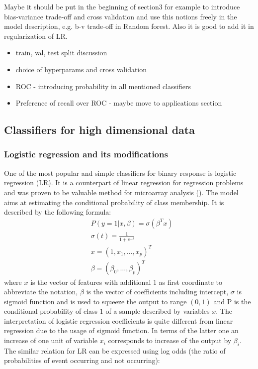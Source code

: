 \documentclass[12pt, wide]{mwart}
\begin{document}
Maybe it should be put in the beginning of section3 for example to introduce bias-variance trade-off and cross validation and use this notions freely in the model description, e.g. b-v trade-off in Random forest. Also it is good to add it in regularization of LR.


\begin{itemize}
    \item train, val, test split discussion 
    \item choice of hyperparams and cross validation
    \item ROC - introducing probability in all mentioned classifiers
    \item Preference of recall over ROC  - maybe move to applications section
\end{itemize}

\subsection{Classifiers for high dimensional data}

\subsubsection{Logistic regression and its modifications}

One of the most popular and simple classifiers for binary response is logistic regression (LR). It is a counterpart of linear regression for regression problems and was proven to be valuable method for microarray analysis (\cite{LRgene}). The model aims at estimating the conditional probability of class membership. It is described by the following formula:
\begin{align*}
    &P(y=1 | x, \beta)=\sigma\left(\beta^{T} x\right) \\
    &\sigma(t) = \frac{1}{1+e^{-t}} \\
    &x=(1, x_1, \ldots, x_p)^T \\
    &\beta = (\beta_0, \ldots, \beta_p)^T
\end{align*}
where $x$ is the vector of features with additional $1$ as first coordinate to abbreviate the notation, $\beta$ is the vector of coefficients including intercept, $\sigma$ is sigmoid function and is used to squeeze the output to range $(0,1)$ and P is the conditional probability of class $1$ of a sample described by variables $x$. The interpretation of logistic regression coefficients is quite different from linear regression due to the usage of sigmoid function. In terms of the latter one an increase of one unit of variable $x_i$ corresponds to increase of the output by $\beta_i$. The similar relation for LR can be expressed using log odds (the ratio of probabilities of event occurring and not occurring):
\end{document}
